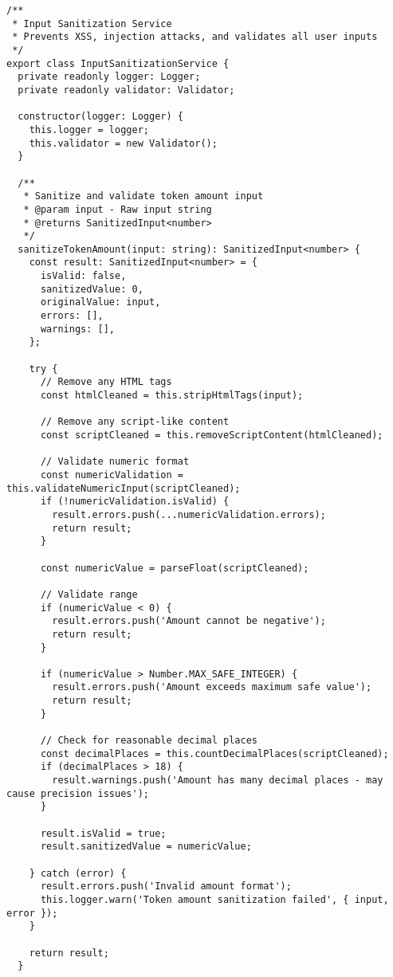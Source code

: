 \documentclass[11pt,a4paper]{article}
\begin{document}
\begin{lstlisting}[style=typescript, caption=Comprehensive Input Sanitization]
/**
 * Input Sanitization Service
 * Prevents XSS, injection attacks, and validates all user inputs
 */
export class InputSanitizationService {
  private readonly logger: Logger;
  private readonly validator: Validator;

  constructor(logger: Logger) {
    this.logger = logger;
    this.validator = new Validator();
  }

  /**
   * Sanitize and validate token amount input
   * @param input - Raw input string
   * @returns SanitizedInput<number>
   */
  sanitizeTokenAmount(input: string): SanitizedInput<number> {
    const result: SanitizedInput<number> = {
      isValid: false,
      sanitizedValue: 0,
      originalValue: input,
      errors: [],
      warnings: [],
    };

    try {
      // Remove any HTML tags
      const htmlCleaned = this.stripHtmlTags(input);
      
      // Remove any script-like content
      const scriptCleaned = this.removeScriptContent(htmlCleaned);
      
      // Validate numeric format
      const numericValidation = this.validateNumericInput(scriptCleaned);
      if (!numericValidation.isValid) {
        result.errors.push(...numericValidation.errors);
        return result;
      }

      const numericValue = parseFloat(scriptCleaned);

      // Validate range
      if (numericValue < 0) {
        result.errors.push('Amount cannot be negative');
        return result;
      }

      if (numericValue > Number.MAX_SAFE_INTEGER) {
        result.errors.push('Amount exceeds maximum safe value');
        return result;
      }

      // Check for reasonable decimal places
      const decimalPlaces = this.countDecimalPlaces(scriptCleaned);
      if (decimalPlaces > 18) {
        result.warnings.push('Amount has many decimal places - may cause precision issues');
      }

      result.isValid = true;
      result.sanitizedValue = numericValue;

    } catch (error) {
      result.errors.push('Invalid amount format');
      this.logger.warn('Token amount sanitization failed', { input, error });
    }

    return result;
  }


\end{lstlisting}
\end{document}
